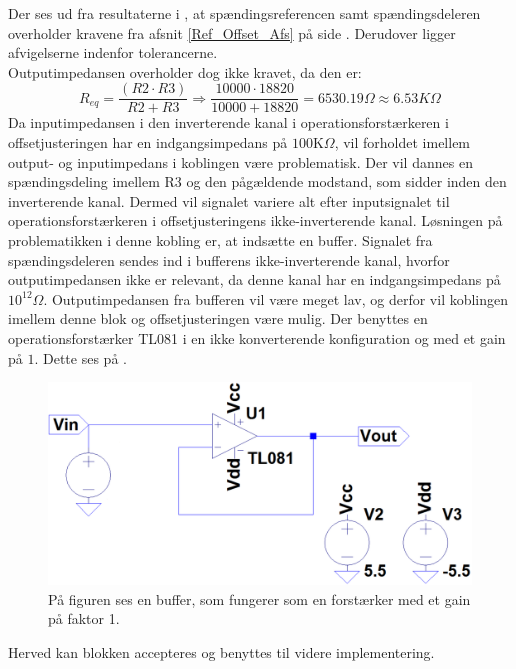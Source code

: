 Der ses ud fra resultaterne i , at spændingsreferencen samt spændingsdeleren overholder kravene fra afsnit \ref{Ref_Offset_Afs} på side \pageref{Ref_Offset_Afs}. Derudover ligger afvigelserne indenfor tolerancerne. \\
Outputimpedansen overholder dog ikke kravet, da den er:
\begin{equation}
R_{eq} = \dfrac{(R2 \cdot R3)}{R2 + R3} \Longrightarrow \dfrac{10000 \cdot 18820}{10000 + 18820} = 6530.19\Omega \approx 6.53K\Omega
\end{equation}
Da inputimpedansen i den inverterende kanal i operationsforstærkeren i offsetjusteringen har en indgangsimpedans på $100$K$\Omega$, vil forholdet imellem output- og inputimpedans i koblingen være problematisk. Der vil dannes en spændingsdeling imellem R$3$ og den pågældende modstand, som sidder inden den inverterende kanal. Dermed vil signalet variere alt efter inputsignalet til operationsforstærkeren i offsetjusteringens ikke-inverterende kanal. Løsningen på problematikken i denne kobling er, at indsætte en buffer. Signalet fra spændingsdeleren sendes ind i bufferens ikke-inverterende kanal, hvorfor outputimpedansen ikke er relevant, da denne kanal har en indgangsimpedans på $10^{12}\Omega$. Outputimpedansen fra bufferen vil være meget lav, og derfor vil koblingen imellem denne blok og offsetjusteringen være mulig. Der benyttes en operationsforstærker TL081 i en ikke konverterende konfiguration og med et gain på $1$. Dette ses på . 
\begin{figure}[H]
	\centering
	\includegraphics[scale=0.4]{figures/cProblemloesning/Buffer_LT.png}
	\caption{På figuren ses en buffer, som fungerer som en forstærker med et gain på faktor 1.}
	\label{fig:Buffer}
\end{figure}
Herved kan blokken accepteres og benyttes til videre implementering.